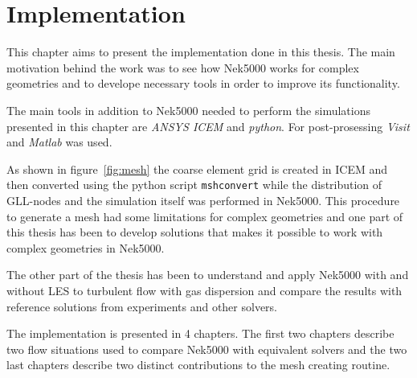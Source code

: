 
\chapter{Implementation} %

\label{implementation} %






This chapter aims to present the implementation done in this thesis. The main motivation 
behind the work was to see how Nek5000 works for complex geometries and to develope 
necessary tools in order to improve its functionality. 

The main tools in addition to Nek5000 needed to perform the simulations presented in this 
chapter are \textit{ANSYS ICEM} and \textit{python}. For post-prosessing \textit{Visit} and
\textit{Matlab} was used.

As shown in figure~\ref{fig:mesh} the coarse element grid is created
in ICEM and then converted using the python script \verb|mshconvert| while the
distribution of GLL-nodes and the simulation itself was 
performed in Nek5000. This procedure to generate a mesh had some limitations
for complex geometries and one part of this thesis has been to develop solutions that makes it 
possible to work with complex geometries in Nek5000.

The other part of the thesis has been to understand and apply Nek5000 with and without 
LES to turbulent flow with gas dispersion and compare the results with reference 
solutions from experiments and other solvers.

The implementation is presented in 4 chapters. The first two chapters describe two flow situations 
used to compare Nek5000 with equivalent solvers and the two last chapters describe two distinct
contributions to the mesh creating routine. 


